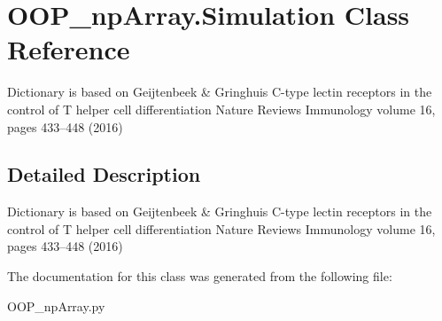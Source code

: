 \hypertarget{class_o_o_p__np_array_1_1_simulation}{}\section{O\+O\+P\+\_\+np\+Array.\+Simulation Class Reference}
\label{class_o_o_p__np_array_1_1_simulation}


Dictionary is based on Geijtenbeek \& Gringhuis C-\/type lectin receptors in the control of T helper cell differentiation Nature Reviews Immunology volume 16, pages 433–448 (2016)  




\subsection{Detailed Description}
Dictionary is based on Geijtenbeek \& Gringhuis C-\/type lectin receptors in the control of T helper cell differentiation Nature Reviews Immunology volume 16, pages 433–448 (2016) 

The documentation for this class was generated from the following file\+:\begin{DoxyCompactItemize}
\item 
O\+O\+P\+\_\+np\+Array.\+py\end{DoxyCompactItemize}
